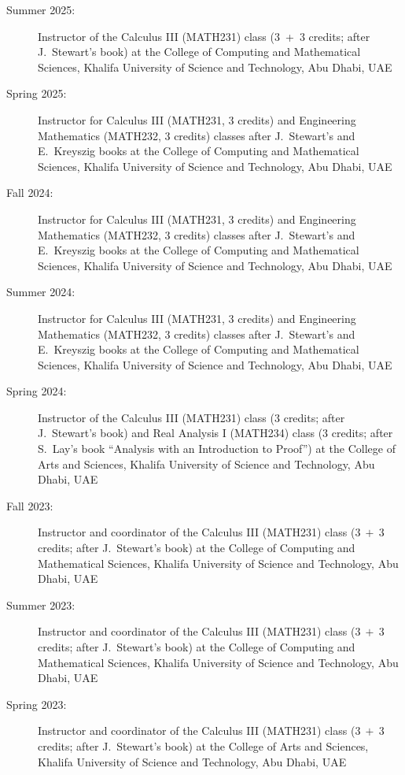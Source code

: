 \documentclass[final, a4paper, oneside, 12pt]{article}
\numberwithin{equation}{section}
\begin{document}
\begin{description}

  \item[Summer 2025:] Instructor of the Calculus III (MATH231) class ($3$\ +\ $3$ credits; after J.~Stewart's book) at the College of Computing and Mathematical Sciences, Khalifa University of Science and Technology, Abu Dhabi, UAE

  \item[Spring 2025:] Instructor for Calculus III (MATH231, $3$ credits) and Engineering Mathematics (MATH232, $3$ credits) classes after J.~Stewart's and E.~Kreyszig books at the College of Computing and Mathematical Sciences, Khalifa University of Science and Technology, Abu Dhabi, UAE

  \item[Fall 2024:] Instructor for Calculus III (MATH231, $3$ credits) and Engineering Mathematics (MATH232, $3$ credits) classes after J.~Stewart's and E.~Kreyszig books at the College of Computing and Mathematical Sciences, Khalifa University of Science and Technology, Abu Dhabi, UAE

  \item[Summer 2024:] Instructor for Calculus III (MATH231, $3$ credits) and Engineering Mathematics (MATH232, $3$ credits) classes after J.~Stewart's and E.~Kreyszig books at the College of Computing and Mathematical Sciences, Khalifa University of Science and Technology, Abu Dhabi, UAE

  \item[Spring 2024:] Instructor of the Calculus III (MATH231) class ($3$ credits; after J.~Stewart's book) and Real Analysis I (MATH234) class ($3$ credits; after S.~Lay's book ``Analysis with an Introduction to Proof'') at the College of Arts and Sciences, Khalifa University of Science and Technology, Abu Dhabi, UAE

  \item[Fall 2023:] Instructor and coordinator of the Calculus III (MATH231) class ($3\ +\ 3$ credits; after J.~Stewart's book) at the College of Computing and Mathematical Sciences, Khalifa University of Science and Technology, Abu Dhabi, UAE

  \item[Summer 2023:] Instructor and coordinator of the Calculus III (MATH231) class ($3\ +\ 3$ credits; after J.~Stewart's book) at the College of Computing and Mathematical Sciences, Khalifa University of Science and Technology, Abu Dhabi, UAE

  \item[Spring 2023:] Instructor and coordinator of the Calculus III (MATH231) class ($3\ +\ 3$ credits; after J.~Stewart's book) at the College of Arts and Sciences, Khalifa University of Science and Technology, Abu Dhabi, UAE


\end{description}
\end{document}
